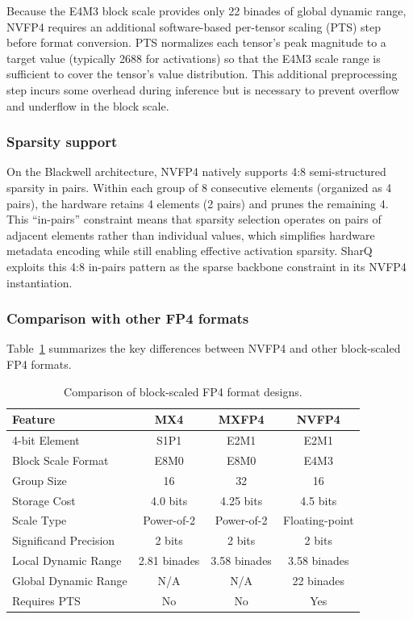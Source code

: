 \documentclass{article}
\begin{document}
Because the E4M3 block scale provides only 22 binades of global dynamic range,
NVFP4 requires an additional software-based per-tensor scaling (PTS) step
before format conversion. PTS normalizes each tensor's peak magnitude to a
target value (typically 2688 for activations) so that the E4M3 scale range is
sufficient to cover the tensor's value distribution. This additional
preprocessing step incurs some overhead during inference but is necessary to
prevent overflow and underflow in the block scale.

\subsubsection{Sparsity support}

On the Blackwell architecture, NVFP4 natively supports 4:8 semi-structured
sparsity in pairs. Within each group of 8 consecutive elements (organized as 4
pairs), the hardware retains 4 elements (2 pairs) and prunes the remaining 4.
This ``in-pairs'' constraint means that sparsity selection operates on pairs of
adjacent elements rather than individual values, which simplifies hardware
metadata encoding while still enabling effective activation sparsity. SharQ
exploits this 4:8 in-pairs pattern as the sparse backbone constraint in its
NVFP4 instantiation.

\subsubsection{Comparison with other FP4 formats}

Table~\ref{tab:nvfp4-comparison} summarizes the key differences between NVFP4
and other block-scaled FP4 formats.

\begin{table}[h]
\caption{Comparison of block-scaled FP4 format designs.}
\label{tab:nvfp4-comparison}
\centering
\small
\begin{tabular}{@{}lccc@{}}
\toprule
Feature & MX4 & MXFP4 & NVFP4 \\
\midrule
4-bit Element       & S1P1       & E2M1  & E2M1 \\
Block Scale Format  & E8M0       & E8M0  & E4M3 \\
Group Size          & 16         & 32    & 16 \\
Storage Cost        & 4.0 bits   & 4.25 bits & 4.5 bits \\
Scale Type          & Power-of-2 & Power-of-2 & Floating-point \\
Significand Precision & 2 bits   & 2 bits & 2 bits \\
Local Dynamic Range & 2.81 binades & 3.58 binades & 3.58 binades \\
Global Dynamic Range & N/A       & N/A   & 22 binades \\
Requires PTS        & No         & No    & Yes \\
\bottomrule
\end{tabular}
\end{table}
\end{document}
